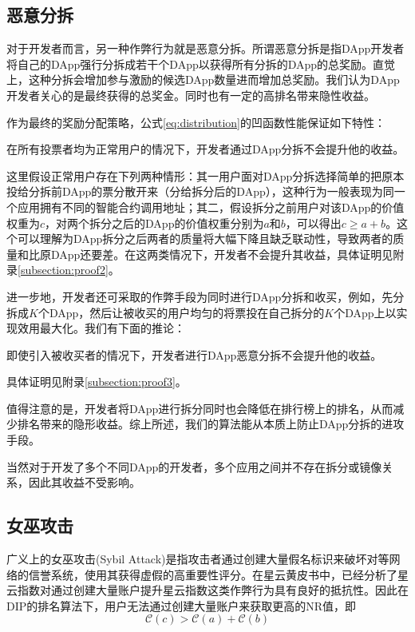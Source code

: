 \subsection{恶意分拆}
\label{subsec:5.2}

对于开发者而言，另一种作弊行为就是恶意分拆。所谓恶意分拆是指DApp开发者将自己的DApp强行分拆成若干个DApp以获得所有分拆的DApp的总奖励。直觉上，这种分拆会增加参与激励的候选DApp数量进而增加总奖励。我们认为DApp开发者关心的是最终获得的总奖金。同时也有一定的高排名带来隐性收益。

作为最终的奖励分配策略，公式\ref{eq:distribution}的凹函数性能保证如下特性：
\begin{property}
\label{p2}
	在所有投票者均为正常用户的情况下，开发者通过DApp分拆不会提升他的收益。
\end{property}
这里假设正常用户存在下列两种情形：其一用户面对DApp分拆选择简单的把原本投给分拆前DApp的票分散开来（分给拆分后的DApp），这种行为一般表现为同一个应用拥有不同的智能合约调用地址；其二，假设拆分之前用户对该DApp的价值权重为$c$，对两个拆分之后的DApp的价值权重分别为$a$和$b$，可以得出$c \geq a+b$。这个可以理解为DApp拆分之后两者的质量将大幅下降且缺乏联动性，导致两者的质量和比原DApp还要差。在这两类情况下，开发者不会提升其收益，具体证明见附录\ref{subsection:proof2}。

进一步地，开发者还可采取的作弊手段为同时进行DApp分拆和收买，例如，先分拆成$K$个DApp，然后让被收买的用户均匀的将票投在自己拆分的$K$个DApp上以实现效用最大化。我们有下面的推论：
\begin{corollary}
	\label{c1}
	即使引入被收买者的情况下，开发者进行DApp恶意分拆不会提升他的收益。
\end{corollary}
具体证明见附录\ref{subsection:proof3}。

值得注意的是，开发者将DApp进行拆分同时也会降低在排行榜上的排名，从而减少排名带来的隐形收益。综上所述，我们的算法能从本质上防止DApp分拆的进攻手段。

当然对于开发了多个不同DApp的开发者，多个应用之间并不存在拆分或镜像关系，因此其收益不受影响。

\subsection{女巫攻击}
广义上的女巫攻击(Sybil Attack)是指攻击者通过创建大量假名标识来破坏对等网络的信誉系统，使用其获得虚假的高重要性评分\cite{quercia2010sybil}。在星云黄皮书中，已经分析了星云指数对通过创建大量账户提升星云指数这类作弊行为具有良好的抵抗性\cite{Nabulasyellowpaper}。因此在DIP的排名算法下，用户无法通过创建大量账户来获取更高的NR值，即%
$$\mathcal{C}(c)>\mathcal{C}(a)+\mathcal{C}(b)$$

